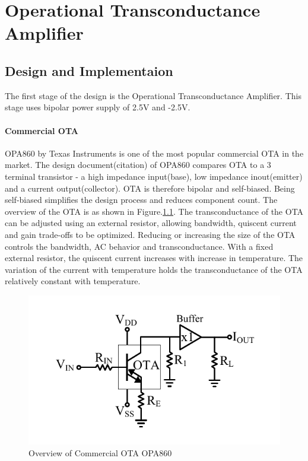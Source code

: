\chapter{Operational Transconductance Amplifier}

\section{Design and Implementaion}

The first stage of the design is the Operational Transconductance Amplifier. This stage uses bipolar power supply of 2.5V and -2.5V. 

\subsubsection{Commercial OTA}
OPA860 by Texas Instruments is one of the most popular commercial OTA in the market. The design document(citation) of OPA860 compares OTA to a 3 terminal transistor - a high impedance input(base), low impedance inout(emitter) and a current output(collector). OTA is therefore bipolar and self-biased. Being self-biased simplifies the design process and reduces component count. The overview of the OTA is as shown in Figure.\ref{fig:OPA}. The transconductance of the OTA can be adjusted using an external resistor, allowing bandwidth, quiscent current and gain trade-offs to be optimized. Reducing or increasing the size of the OTA controls the bandwidth, AC behavior and transconductance. With a fixed external resistor, the quiscent current increases with increase in temperature. The variation of the current with temperature holds the transconductance of the OTA relatively constant with temperature.

\begin{figure} [H]
\centering
\includegraphics[scale=1]{Figures/Misc/PDFs/OPA.pdf}
\caption{Overview of Commercial OTA OPA860}
\label{fig:OPA}
\end{figure}

